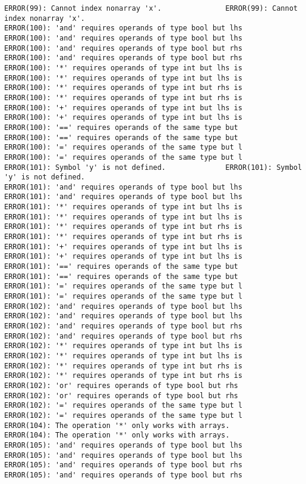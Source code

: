 \documentclass[12pt]{book}
\begin{document}
\begin{lstlisting}
ERROR(99): Cannot index nonarray 'x'.				ERROR(99): Cannot index nonarray 'x'.
ERROR(100): 'and' requires operands of type bool but lhs	ERROR(100): 'and' requires operands of type bool but lhs
ERROR(100): 'and' requires operands of type bool but rhs	ERROR(100): 'and' requires operands of type bool but rhs
ERROR(100): '*' requires operands of type int but lhs is	ERROR(100): '*' requires operands of type int but lhs is
ERROR(100): '*' requires operands of type int but rhs is	ERROR(100): '*' requires operands of type int but rhs is
ERROR(100): '+' requires operands of type int but lhs is	ERROR(100): '+' requires operands of type int but lhs is
ERROR(100): '==' requires operands of the same type but 	ERROR(100): '==' requires operands of the same type but 
ERROR(100): '=' requires operands of the same type but l	ERROR(100): '=' requires operands of the same type but l
ERROR(101): Symbol 'y' is not defined.				ERROR(101): Symbol 'y' is not defined.
ERROR(101): 'and' requires operands of type bool but lhs	ERROR(101): 'and' requires operands of type bool but lhs
ERROR(101): '*' requires operands of type int but lhs is	ERROR(101): '*' requires operands of type int but lhs is
ERROR(101): '*' requires operands of type int but rhs is	ERROR(101): '*' requires operands of type int but rhs is
ERROR(101): '+' requires operands of type int but lhs is	ERROR(101): '+' requires operands of type int but lhs is
ERROR(101): '==' requires operands of the same type but 	ERROR(101): '==' requires operands of the same type but 
ERROR(101): '=' requires operands of the same type but l	ERROR(101): '=' requires operands of the same type but l
ERROR(102): 'and' requires operands of type bool but lhs	ERROR(102): 'and' requires operands of type bool but lhs
ERROR(102): 'and' requires operands of type bool but rhs	ERROR(102): 'and' requires operands of type bool but rhs
ERROR(102): '*' requires operands of type int but lhs is	ERROR(102): '*' requires operands of type int but lhs is
ERROR(102): '*' requires operands of type int but rhs is	ERROR(102): '*' requires operands of type int but rhs is
ERROR(102): 'or' requires operands of type bool but rhs 	ERROR(102): 'or' requires operands of type bool but rhs 
ERROR(102): '=' requires operands of the same type but l	ERROR(102): '=' requires operands of the same type but l
ERROR(104): The operation '*' only works with arrays.		ERROR(104): The operation '*' only works with arrays.
ERROR(105): 'and' requires operands of type bool but lhs	ERROR(105): 'and' requires operands of type bool but lhs
ERROR(105): 'and' requires operands of type bool but rhs	ERROR(105): 'and' requires operands of type bool but rhs

\end{lstlisting}
\end{document}
